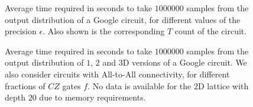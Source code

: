 \begin{figure}[p]
\centering
\begin{scaletikzpicturetowidth}{0.8\textwidth}

\end{scaletikzpicturetowidth}
\caption{Average time required in seconds to take $1000000$ samples from the output distribution of a Google circuit, for different values of the precision $\epsilon$. Also shown is the corresponding $T$ count of the circuit.}\label{fig:precision_runtimes}
\end{figure}
\begin{figure}[p]
\centering
\begin{scaletikzpicturetowidth}{0.7\textwidth}

\end{scaletikzpicturetowidth}
\caption{Average time required in seconds to take $1000000$ samples from the output distribution of $1$, $2$ and $3$D versions of a Google circuit. We also consider circuits with All-to-All connectivity, for different fractions of $CZ$ gates $f$. No data is available for the $2$D lattice with depth $20$ due to memory requirements.}\label{fig:connectivity_runtimes}
\end{figure}
